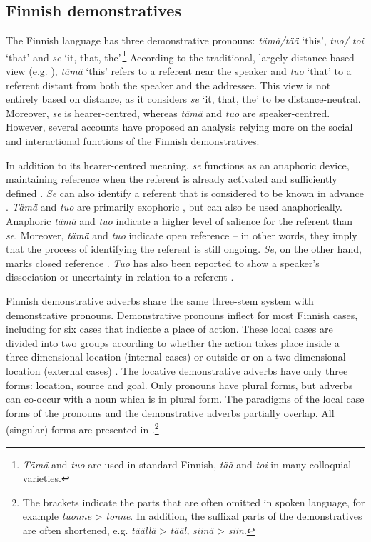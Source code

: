 \documentclass[output=paper,colorlinks,citecolor=brown]{langscibook}
\begin{document}
\subsection{Finnish demonstratives}\label{sec:nahkola:3.3}

The Finnish language has three demonstrative pronouns: \textit{tämä/tää} ‘this’, \textit{tuo/ toi} ‘that’ and \textit{se} ‘it, that, the’.\footnote{\textit{Tämä} and \textit{tuo} are used in standard Finnish, \textit{tää} and \textit{toi} in many colloquial varieties.} According to the traditional, largely distance-based view (e.g. \citealt{Larjavaara1990}), \textit{tämä} ‘this’ refers to a referent near the speaker and \textit{tuo} ‘that’ to a referent distant from both the speaker and the addressee. This view is not entirely based on distance, as it considers \textit{se} ‘it, that, the’ to be distance-neutral. Moreover, \textit{se} is hearer-centred, whereas \textit{tämä} and \textit{tuo} are speaker-centred. However, several accounts \citep{Itkonen1966,Laury1997,Seppänen1998,Etelämäki2006} have proposed an analysis relying more on the social and interactional functions of the Finnish demonstratives.

In addition to its hearer-centred meaning, \textit{se} functions as an anaphoric device, maintaining reference when the referent is already activated and sufficiently defined \citep{Laury1997,Etelämäki2005,Duvallon2005}. \textit{Se} can also identify a referent that is considered to be known in advance \citep{Laury1997}. \textit{Tämä} and \textit{tuo} are primarily exophoric \citep{HakulinenEtAl2004}, but can also be used anaphorically. Anaphoric \textit{tämä} and \textit{tuo} indicate a higher level of salience for the referent than \textit{se}. Moreover, \textit{tämä} and \textit{tuo} indicate open reference – in other words, they imply that the process of identifying the referent is still ongoing. \textit{Se}, on the other hand, marks closed reference \citep{Etelämäki2005}. \textit{Tuo} has also been reported to show a speaker’s dissociation or uncertainty in relation to a referent \citep{Hakulinen1985,Laury1997}.

Finnish demonstrative adverbs share the same three-stem system with demonstrative pronouns. Demonstrative pronouns inflect for most Finnish cases, including for six cases that indicate a place of action. These local cases are divided into two groups according to whether the action takes place inside a three-dimensional location (internal cases) or outside or on a two-dimensional location (external cases) \citep{HakulinenEtAl2004}. The locative demonstrative adverbs have only three forms: location, source and goal. Only pronouns have plural forms, but adverbs can co-occur with a noun which is in plural form. The paradigms of the local case forms of the pronouns and the demonstrative adverbs partially overlap. All (singular) forms are presented in .\footnote{The brackets indicate the parts that are often omitted in spoken language, for example \textit{tuonne} > \textit{tonne}. In addition, the suffixal parts of the demonstratives are often shortened, e.g. \textit{täällä} > \textit{tääl,} \textit{siinä} > \textit{siin}.}
\end{document}
